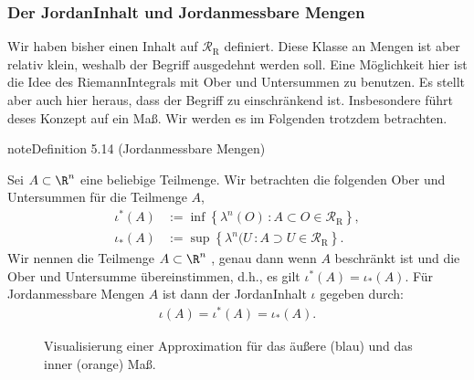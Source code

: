 \documentclass[letterpaper,10pt,german]{jupyterBook}
\let\sphinxpxdimen\pdfpxdimen\else\newdimen\sphinxpxdimen
\begin{document}
\subsubsection{Der Jordan\sphinxhyphen{}Inhalt und Jordan\sphinxhyphen{}messbare Mengen}
\label{\detokenize{masstheorie/masstheorie:der-jordan-inhalt-und-jordan-messbare-mengen}}
\sphinxAtStartPar
Wir haben bisher einen Inhalt auf \(\mathcal{R}_{\text{R}}\) definiert. Diese Klasse an Mengen ist aber relativ klein, weshalb der Begriff ausgedehnt werden soll. Eine Möglichkeit hier ist die Idee des Riemann\sphinxhyphen{}Integrals mit Ober\sphinxhyphen{} und Untersummen zu benutzen. Es stellt aber auch hier heraus, dass der Begriff zu einschränkend ist. Insbesondere führt deses Konzept  auf ein Maß. Wir werden es im Folgenden trotzdem betrachten.
\label{masstheorie/masstheorie:definition-27}
\begin{sphinxadmonition}{note}{Definition 5.14 (Jordan\sphinxhyphen{}messbare Mengen)}



\sphinxAtStartPar
Sei \(A \subset \R^n\) eine beliebige Teilmenge.
Wir betrachten die folgenden  Ober\sphinxhyphen{} und Untersummen für die Teilmenge \(A\),
\begin{equation*}
\begin{split}\iota^\ast(A) &:= \inf \left\{ \lambda^n(O) \, : A \subset O \in\mathcal{R}_{\text{R}}\right\},\\
\iota_\ast(A) &:= \sup \left\{ \lambda^n(U \, : A \supset U\in\mathcal{R}_{\text{R}} \right\}.\end{split}
\end{equation*}
\sphinxAtStartPar
Wir nennen die Teilmenge \(A \subset \R^n\) , genau dann wenn \(A\) beschränkt ist und die Ober\sphinxhyphen{} und Untersumme übereinstimmen, d.h., es gilt \(\iota^\ast(A) = \iota_\ast(A)\).
Für Jordan\sphinxhyphen{}messbare Mengen \(A\) ist dann der Jordan\sphinxhyphen{}Inhalt \(\iota\) gegeben durch:
\begin{equation*}
\begin{split}\iota(A) = \iota^\ast(A) = \iota_\ast(A).\end{split}
\end{equation*}\end{sphinxadmonition}

\begin{figure}[htbp]
\centering
\capstart

\noindent\sphinxincludegraphics[width=400\sphinxpxdimen]{{jordanmeasure}.jpg}
\caption{Visualisierung einer Approximation für das äußere (blau) und das inner (orange) Maß.}\label{\detokenize{masstheorie/masstheorie:fig-jordanmeasure}}\end{figure}
\end{document}
